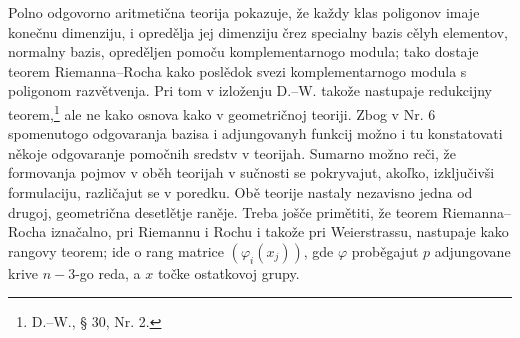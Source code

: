 \documentclass[11pt]{article}
\begin{document}
Polno odgovorno aritmetična teorija pokazuje, že každy klas poligonov imaje konečnu dimenziju, i opredělja jej dimenziju črez specialny bazis cělyh elementov, normalny bazis, opreděljen pomoču komplementarnogo modula; tako dostaje teorem Riemanna--Rocha kako poslědok svezi komplementarnogo modula s poligonom razvětvenja. Pri tom v izloženju D.--W. takože nastupaje redukcijny teorem,\footnote{D.--W., § 30, Nr. 2.} ale ne kako osnova kako v geometričnoj teoriji. Zbog v Nr. 6 spomenutogo odgovaranja bazisa i adjungovanyh funkcij možno i tu konstatovati někoje odgovaranje pomočnih sredstv v teorijah. Sumarno možno reči, že formovanja pojmov v oběh teorijah v sučnosti se pokryvajut, akoľko, izključivši formulaciju, različajut se v poredku. Obě teorije nastaly nezavisno jedna od drugoj, geometrična desetlětje raněje. Treba jošče primětiti, že teorem Riemanna--Rocha iznačalno, pri Riemannu i Rochu i takože pri Weierstrassu, nastupaje kako rangovy teorem; ide o rang matrice \((\varphi_i(x_j))\), gde \(\varphi\) proběgajut \(p\) adjungovane krive \(n-3\)-go reda, a \(x\) točke ostatkovoj grupy.
\end{document}
